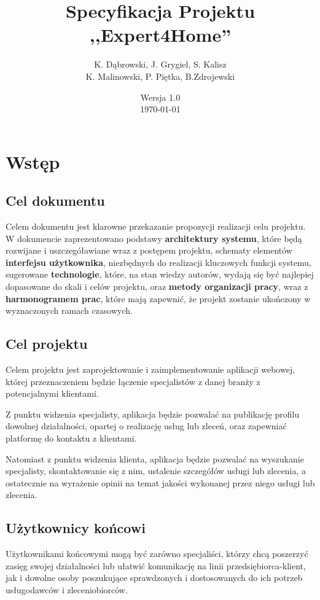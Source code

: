 \documentclass[10pt, titlepage, oneside, a4paper]{article}
\title{Specyfikacja Projektu ,,Expert4Home''}
\author{K. Dąbrowski, J. Grygiel, S. Kalisz\\
K. Malinowski, P. Piętka, B.Zdrojewski}
\date{Wersja 1.0\\\today}
\begin{document}
	\maketitle
	\thispagestyle{empty}  
	\newpage
  
	\section{Wstęp} 
  
	\subsection{Cel dokumentu}
	Celem dokumentu jest klarowne przekazanie propozycji realizacji celu projektu. W dokumencie zaprezentowano podstawy \textbf{architektury systemu}, które będą rozwijane i uszczegóławiane wraz z postępem projektu, schematy elementów \textbf{interfejsu użytkownika}, niezbędnych do realizacji kluczowych funkcji systemu, sugerowane \textbf{technologie}, które, na stan wiedzy autorów, wydają się być najlepiej dopasowane do skali i celów projektu, oraz \textbf{metody organizacji pracy}, wraz z \textbf{harmonogramem prac}, które mają zapewnić, że projekt zostanie ukończony w wyznaczonych ramach czasowych.
  
	\subsection{Cel projektu}
	Celem projektu jest zaprojektowanie i zaimplementowanie aplikacji webowej, której przeznaczeniem będzie łączenie specjalistów z danej branży z potencjalnymi klientami. 
	
	Z punktu widzenia specjalisty, aplikacja będzie pozwalać na publikację profilu dowolnej działalności, opartej o realizację usług lub zleceń, oraz zapewniać platformę do kontaktu z klientami.
	
	Natomiast z punktu widzenia klienta, aplikacja będzie pozwalać na wyszukanie specjalisty, skontaktowanie się z nim, ustalenie szczegółów usługi lub zlecenia, a ostatecznie na wyrażenie opinii na temat jakości wykonanej przez niego usługi lub zlecenia.
  
	\subsection{Użytkownicy końcowi}
	Użytkownikami końcowymi mogą być zarówno specjaliści, którzy chcą poszerzyć zasięg swojej działalności lub ułatwić komunikację na linii przedsiębiorca-klient, jak i dowolne osoby poszukujące sprawdzonych i dostosowanych do ich potrzeb usługodawców i zleceniobiorców.
	\newpage  
  
\end{document}
